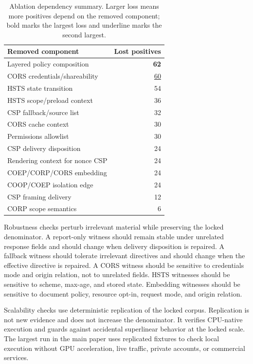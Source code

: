 \documentclass[10pt,conference]{IEEEtran}
\begin{document}
\begin{table}[t]
\centering
\caption{Ablation dependency summary. Larger loss means more positives depend on the removed component; bold marks the largest loss and underline marks the second largest.}
\label{tab:supp-ablation}
\begin{tabular}{lr}
\toprule
Removed component & Lost positives \\
\midrule
Layered policy composition & \textbf{62} \\
CORS credentials/shareability & \underline{60} \\
HSTS state transition & 54 \\
HSTS scope/preload context & 36 \\
CSP fallback/source list & 32 \\
CORS cache context & 30 \\
Permissions allowlist & 30 \\
CSP delivery disposition & 24 \\
Rendering context for nonce CSP & 24 \\
COEP/CORP/CORS embedding & 24 \\
COOP/COEP isolation edge & 24 \\
CSP framing delivery & 12 \\
CORP scope semantics & 6 \\
\bottomrule
\end{tabular}
\end{table}

Robustness checks perturb irrelevant material while preserving the locked denominator. A report-only witness should remain stable under unrelated response fields and should change when delivery disposition is repaired. A fallback witness should tolerate irrelevant directives and should change when the effective directive is repaired. A CORS witness should be sensitive to credentials mode and origin relation, not to unrelated fields. HSTS witnesses should be sensitive to scheme, max-age, and stored state. Embedding witnesses should be sensitive to document policy, resource opt-in, request mode, and origin relation.

Scalability checks use deterministic replication of the locked corpus. Replication is not new evidence and does not increase the denominator. It verifies CPU-native execution and guards against accidental superlinear behavior at the locked scale. The largest run in the main paper uses replicated fixtures to check local execution without GPU acceleration, live traffic, private accounts, or commercial services.
\end{document}
